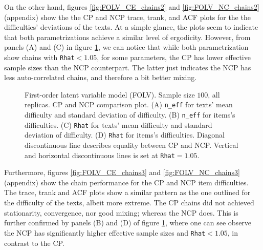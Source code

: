 On the other hand, figures \ref{fig:FOLV_CE_chains2} and \ref{fig:FOLV_NC_chains2} (appendix) show the the CP and NCP trace, trank, and ACF plots for the the difficulties' deviations of the texts. At a simple glance, the plots seem to indicate that both parametrizations achieve a similar level of ergodicity. However, from panels (A) and (C) in figure \ref{fig:FOLV_stat1}, we can notice that while both parametrization show chains with \texttt{Rhat}$<1.05$, for some parameters, the CP has lower effective sample sizes than the NCP counterpart. The latter just indicates the NCP has less auto-correlated chains, and therefore a bit better mixing.
%
\begin{figure}[H]
	\centering
	\begin{subfigure}
		\texttt{[image: FOLV\_100\_neff1]}
	\end{subfigure}
	\begin{subfigure}
		\texttt{[image: FOLV\_100\_Rhat1]}
	\end{subfigure}
	\caption[First-order latent variable model (FOLV). Sample size $100$, all replicas. CP and NCP comparison plot.]%
	{First-order latent variable model (FOLV). Sample size $100$, all replicas. CP and NCP comparison plot. (A) \texttt{n\_eff} for texts' mean difficulty and standard deviation of difficulty. (B) \texttt{n\_eff} for items's difficulties. (C) \texttt{Rhat} for texts' mean difficulty and standard deviation of difficulty. (D) \texttt{Rhat} for items's difficulties. Diagonal discontinuous line describes equality between CP and NCP. Vertical and horizontal discontinuous lines is set at \texttt{Rhat}$=1.05$. }
	\label{fig:FOLV_stat1}
\end{figure}

Furthermore, figures \ref{fig:FOLV_CE_chains3} and \ref{fig:FOLV_NC_chains3} (appendix) show the chain performance for the CP and NCP item difficulties. The trace, trank and ACF plots show a similar pattern as the one outlined for the difficulty of the texts, albeit more extreme. The CP chains did not achieved stationarity, convergence, nor good mixing; whereas the NCP does. This is further confirmed by panels (B) and (D) of figure \ref{fig:FOLV_stat1}, where one can see observe the NCP has significantly higher effective sample sizes and \texttt{Rhat}$<1.05$, in contrast to the CP.

